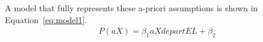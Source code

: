 A model that fully represents these a-priori assumptions is shown in Equation~\ref{eq:model1}.
\begin{align}
    P(aX) = \beta_1 aXdepartEL + \beta_2 \\
\end{align}
